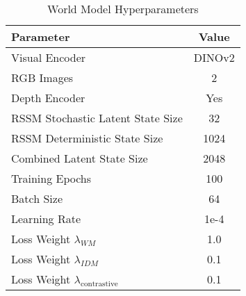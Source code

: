 \documentclass{article} %
\begin{document}
\begin{table}[htp]
    \centering
    \label{tab:world_model_hyperparameters}
    \begin{tabular}{lc}
        \toprule
        \textbf{Parameter} & \textbf{Value} \\
        \midrule
        Visual Encoder & DINOv2 \\
        RGB Images & 2 \\
        Depth Encoder & Yes \\
        RSSM Stochastic Latent State Size & 32 \\
        RSSM Deterministic State Size & 1024 \\
        Combined Latent State Size & 2048 \\
        Training Epochs & 100 \\
        Batch Size & 64 \\
        Learning Rate & 1e-4 \\
        Loss Weight $\lambda_{WM}$ & 1.0 \\
        Loss Weight $\lambda_{IDM}$ & 0.1 \\
        Loss Weight $\lambda_{\text{contrastive}}$ & 0.1 \\
        \bottomrule
    \end{tabular}
    \caption{World Model Hyperparameters}
\end{table}

\newpage
\end{document}
